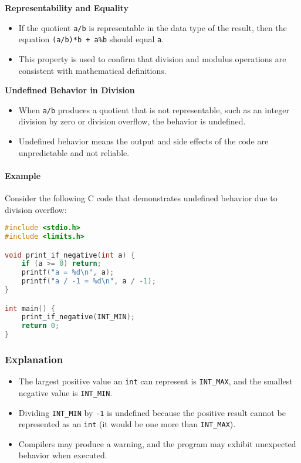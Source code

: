 \documentclass[12pt]{article}
\begin{document}
\textbf{Representability and Equality}
\begin{itemize}
    \item If the quotient \texttt{a/b} is representable in the data type of the result, then the equation \texttt{(a/b)*b + a\%b} should equal \texttt{a}.
    \item This property is used to confirm that division and modulus operations are consistent with mathematical definitions.
\end{itemize}

\textbf{Undefined Behavior in Division}
\begin{itemize}
    \item When \texttt{a/b} produces a quotient that is not representable, such as an integer division by zero or division overflow, the behavior is undefined.
    \item Undefined behavior means the output and side effects of the code are unpredictable and not reliable.
\end{itemize}

\paragraph{Example}
Consider the following C code that demonstrates undefined behavior due to division overflow:

\begin{lstlisting}[language=C]
#include <stdio.h>
#include <limits.h>

void print_if_negative(int a) {
    if (a >= 0) return;
    printf("a = %d\n", a);
    printf("a / -1 = %d\n", a / -1);
}

int main() {
    print_if_negative(INT_MIN);
    return 0;
}
\end{lstlisting}

\subsubsection{Explanation}
\begin{itemize}
    \item The largest positive value an \texttt{int} can represent is \texttt{INT\_MAX}, and the smallest negative value is \texttt{INT\_MIN}.
    \item Dividing \texttt{INT\_MIN} by \texttt{-1} is undefined because the positive result cannot be represented as an \texttt{int} (it would be one more than \texttt{INT\_MAX}).
    \item Compilers may produce a warning, and the program may exhibit unexpected behavior when executed.
\end{itemize}
\end{document}
